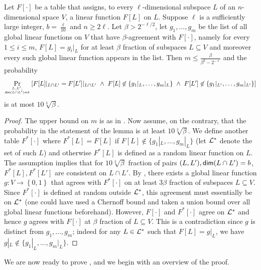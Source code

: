 \documentclass{toc}
\newcommand\set[1]{{\left\{ #1 \right\}}}
\newcommand\Prob[2]{{\Pr_{#1}\left[ {#2} \right]}}
\newcommand\power[1]{\set{0,1}^{#1}}
\renewcommand\geq{\geqslant}
\renewcommand\leq{\leqslant}
\begin{document}
\begin{lemma} \label{lemma:lin-aux-2} Let $F[\cdot]$ be a table that assigns, to every $\ell$-dimensional subspace $L$ of an $n$-dimensional space $V$, a linear
function $F[L]$ on $L$. Suppose $\ell$ is a sufficiently large
integer, $b = \frac{\ell}{10}$ and $n \geq 2\ell$.
Let $\beta>2^{-\ell/2}$, let $g_1, \ldots,
g_m$ be the list of all global linear functions on $V$ that have
$\beta$-agreement with $F[\cdot]$, namely
for every $1 \leq i \leq m$, $F[L] = g_i|_L$ for at least $\beta$ fraction of subspaces $L \subseteq V$ and moreover every such global linear
function appears in the list. Then $m \leq \frac{\beta}{\beta^2- 2^{-\ell}}$ and  the probability
 $$ \Prob{L, L', \atop{ {\sf dim}(L \cap L')=b } }{F[L]|_{L \cap L'} = F[L']|_{L\cap L'} ~\wedge ~F[L]\not\in \{  g_1|_L, \ldots, g_m|_L\}
 ~\wedge ~F[L']\not\in \{  g_1|_{L'}, \ldots, g_m|_{L'} \} } $$ is at most $10 \sqrt[3]{\beta}.$
\end{lemma}
\begin{proof}
 The upper bound on $m$ is as in \cite[Theorem 2.6]{KMS}. Now assume, on the contrary, that the probability in the statement of the lemma is at least $10 \sqrt[3]{\beta}.$  We define
 another table $F^*[\cdot]$ where $F^*[L] = F[L]$ if $F[L] \not\in \{ g_1|_L,\ldots, g_m|_L\}$ (let ${\cal L}^*$ denote the set of such $L$)
 and otherwise $F^*[L]$ is defined as a random linear function on
 $L$. The assumption implies that for $10 \sqrt[3]{\beta}$ fraction of pairs $(L, L'), {\sf dim}(L\cap L')=b$, $F^*[L], F^*[L']$ are consistent on $L \cap L'$. By ,
 there exists a global linear function $g:V \to \power{}$ that agrees with $F^*[\cdot]$ on at least $3\beta$ fraction of subspaces $L \subseteq V$. Since
 $F^*[\cdot]$ is defined at random outside ${\cal L}^*$, this agreement must essentially be on ${\cal L}^*$ (one could have used a Chernoff bound and taken a union bound
 over all global linear functions beforehand). However, $F[\cdot]$ and $F^*[\cdot]$ agree on ${\cal L}^*$ and hence $g$ agrees with $F[\cdot]$ at $\beta$
 fraction of $L \subseteq V$. This is a contradiction since $g$ is distinct from $g_1,\ldots, g_m$; indeed for any $L \in {\cal L}^*$ such that $F[L] = g|_L$, we have
 $g|_L \not\in \{g_1|_L, \ldots, g_m|_L \}$.
\end{proof}

We are now ready to prove , and we begin with an overview of the proof.

%
\end{document}
